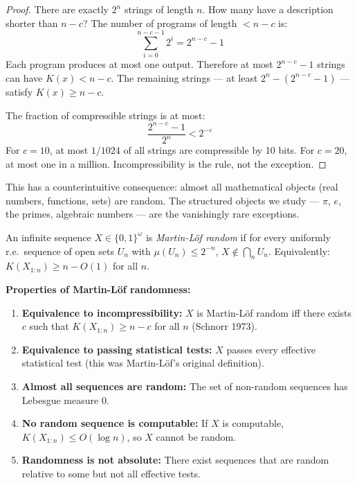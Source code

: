 \begin{proof}
There are exactly $2^n$ strings of length $n$. How many have a description shorter than $n-c$? The number of programs of length $< n-c$ is:
\[
\sum_{i=0}^{n-c-1} 2^i = 2^{n-c} - 1
\]
Each program produces at most one output. Therefore at most $2^{n-c} - 1$ strings can have $K(x) < n-c$. The remaining strings --- at least $2^n - (2^{n-c} - 1)$ --- satisfy $K(x) \ge n-c$.

The fraction of compressible strings is at most:
\[
\frac{2^{n-c} - 1}{2^n} < 2^{-c}
\]
For $c = 10$, at most $1/1024$ of all strings are compressible by 10 bits. For $c = 20$, at most one in a million. Incompressibility is the rule, not the exception.
\end{proof}

This has a counterintuitive consequence: almost all mathematical objects (real numbers, functions, sets) are random. The structured objects we study --- $\pi$, $e$, the primes, algebraic numbers --- are the vanishingly rare exceptions.

\begin{definition}
An infinite sequence $X \in \{0,1\}^\omega$ is \emph{Martin-L\"of random} if for every uniformly r.e.\ sequence of open sets $U_n$ with $\mu(U_n) \le 2^{-n}$, $X \notin \bigcap_n U_n$. Equivalently: $K(X_{1:n}) \ge n - O(1)$ for all $n$.
\end{definition}

\textbf{Properties of Martin-L\"of randomness:}
\begin{enumerate}
\item \textbf{Equivalence to incompressibility:} $X$ is Martin-L\"of random iff there exists $c$ such that $K(X_{1:n}) \ge n - c$ for all $n$ (Schnorr 1973).
\item \textbf{Equivalence to passing statistical tests:} $X$ passes every effective statistical test (this was Martin-L\"of's original definition).
\item \textbf{Almost all sequences are random:} The set of non-random sequences has Lebesgue measure 0.
\item \textbf{No random sequence is computable:} If $X$ is computable, $K(X_{1:n}) \le O(\log n)$, so $X$ cannot be random.
\item \textbf{Randomness is not absolute:} There exist sequences that are random relative to some but not all effective tests.
\end{enumerate}

